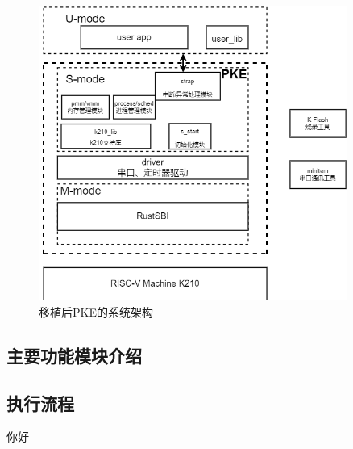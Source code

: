 \begin{figure}[htbp]
    \vspace{13pt} %
    \centering
    \includegraphics[width=0.9\textwidth]{images/after_sys_struct.drawio.png}
    \caption{移植后PKE的系统架构}\label{移植后PKE的系统架构} %
\end{figure}

\subsection{主要功能模块介绍}

\subsection{执行流程}
你好
